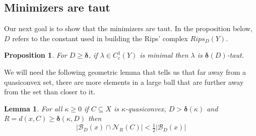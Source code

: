 \documentclass{amsart}
\numberwithin{equation}{section}
\newtheorem{proposition}[theorem]{Proposition}
\newtheorem{lemma}[theorem]{Lemma}
\theoremstyle{definition}
\newcommand{\bfd}{\mathbf{d}}
\newcommand{\calB}{\mathcal{B}}
\newcommand{\calN}{\mathcal{N}}
\newcommand{\bdelta}{{\boldsymbol\delta}}
\DeclareMathOperator{\conv}{Conv}
\begin{document}
\subsection{Minimizers are taut}

Our next goal is to show that the minimizers are taut.
In the proposition below, $D$ refers to the constant used in building the Rips' complex $Rips_D(Y)$.
\begin{proposition}\label{minimal is taut}
    For $D \ge \bdelta$, if $\lambda\in C^1_c(Y)$ is minimal then $\lambda$ is $\bdelta(D)$-taut.
\end{proposition}

We will need the following geometric lemma that tells us that far away from a quasiconvex set, there are more elements in a large ball that are further away from the set than closer to it. 
\begin{lemma}\label{lem: more far than close}
    For all $\kappa\ge 0$ if $C\subseteq X$ is $\kappa$-quasiconvex, $D>\bdelta(\kappa)$ and $R=d(x,C)\ge \bdelta(\kappa,D)$ then \begin{equation}\label{eq: more outside than in}
        |\calB_D(x)\cap \calN_{R}(C)|<\tfrac12|\calB_D(x)|
    \end{equation}
\end{lemma}
\end{document}
